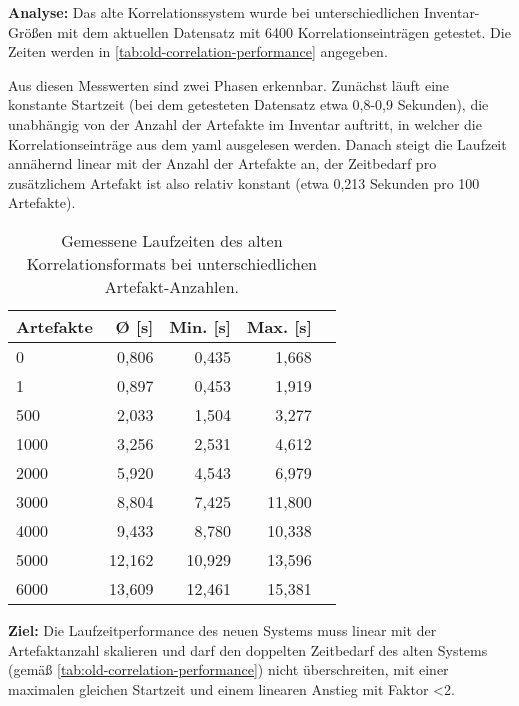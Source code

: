 \textbf{Analyse:}
Das alte Korrelationssystem wurde bei unterschiedlichen Inventar-Größen mit dem aktuellen Datensatz mit 6400 Korrelationseinträgen getestet.
Die Zeiten werden in \autoref{tab:old-correlation-performance} angegeben.

Aus diesen Messwerten sind zwei Phasen erkennbar.
Zunächst läuft eine konstante Startzeit (bei dem getesteten Datensatz etwa 0,8-0,9 Sekunden), die unabhängig von der Anzahl der Artefakte im Inventar auftritt, in welcher die Korrelationseinträge aus dem \acrshort{yaml} ausgelesen werden.
Danach steigt die Laufzeit annähernd linear mit der Anzahl der Artefakte an, der Zeitbedarf pro zusätzlichem Artefakt ist also relativ konstant (etwa 0,213 Sekunden pro 100 Artefakte).

\begin{table}[h!]
    \centering
    \begin{tabular}{l r r r r}
        \toprule
        \textbf{Artefakte} & \textbf{Ø [s]} & \textbf{Min. [s]} & \textbf{Max. [s]} \\
        \midrule
        0                  & 0,806          & 0,435             & 1,668             \\
        1                  & 0,897          & 0,453             & 1,919             \\
        500                & 2,033          & 1,504             & 3,277             \\
        1000               & 3,256          & 2,531             & 4,612             \\
        2000               & 5,920          & 4,543             & 6,979             \\
        3000               & 8,804          & 7,425             & 11,800            \\
        4000               & 9,433          & 8,780             & 10,338            \\
        5000               & 12,162         & 10,929            & 13,596            \\
        6000               & 13,609         & 12,461            & 15,381            \\
        \bottomrule
    \end{tabular}
    \caption{Gemessene Laufzeiten des alten Korrelationsformats bei unterschiedlichen Artefakt-Anzahlen.}
    \label{tab:old-correlation-performance}
\end{table}

\textbf{Ziel:}
Die Laufzeitperformance des neuen Systems muss linear mit der Artefaktanzahl skalieren und darf den doppelten Zeitbedarf des alten Systems (gemäß \autoref{tab:old-correlation-performance}) nicht überschreiten, mit einer maximalen gleichen Startzeit und einem linearen Anstieg mit Faktor <2.

